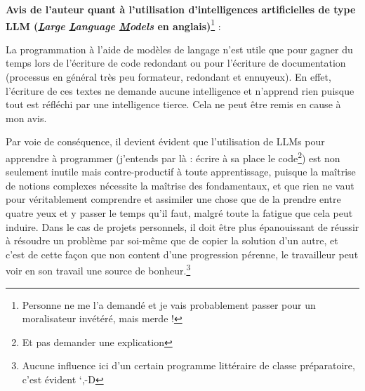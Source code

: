 \documentclass[../../../main.tex]{subfiles}
\begin{document}
\textbf{Avis de l'auteur quant à l'utilisation d'intelligences artificielles de type LLM (\textit{\underline{L}arge \underline{L}anguage \underline{M}odels} en anglais)}\footnote{Personne ne me l'a demandé et je vais probablement passer pour un moralisateur invétéré, mais merde !} :
 
La programmation à l'aide de modèles de langage n'est utile que pour gagner du temps lors de l'écriture de code redondant ou pour l'écriture de documentation (processus en général très peu formateur, redondant et ennuyeux). En effet, l'écriture de ces textes ne demande aucune intelligence et n'apprend rien puisque tout est réfléchi par une intelligence tierce. Cela ne peut être remis en cause à mon avis.
 
Par voie de conséquence, il devient évident que l'utilisation de LLMs pour apprendre à programmer (j'entends par là : écrire à sa place le code\footnote{Et pas demander une explication}) est non seulement inutile mais contre-productif à toute apprentissage, puisque la maîtrise de notions complexes nécessite la maîtrise des fondamentaux, et que rien ne vaut pour véritablement comprendre et assimiler une chose que de la prendre entre quatre yeux et y passer le temps qu'il faut, malgré toute la fatigue que cela peut induire. Dans le cas de projets personnels, il doit être plus épanouissant de réussir à résoudre un problème par soi-même que de copier la solution d'un autre, et c'est de cette façon que non content d'une progression pérenne, le travailleur peut voir en son travail une source de bonheur.\footnote{Aucune influence ici d'un certain programme littéraire de classe préparatoire, c'est évident `,-D}
 
\end{document}
